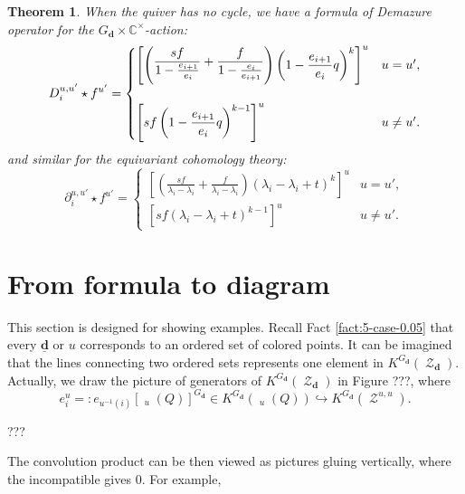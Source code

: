 \documentclass[reqno,11pt]{book}
\numberwithin{equation}{section}
\theoremstyle{plain}
\newtheorem{theorem}{Theorem}[section]
\theoremstyle{plain}
\numberwithin{equation}{section}
\theoremstyle{remark}
\DeclareMathOperator{\RRep}{\widetilde{\operatorname{Rep}}}
\DeclareMathOperator{\St}{\mathcal{Z}}
\newcommand{\dimvec}[1]{\mathbf{#1}}
\newcommand{\ftdimvec}[1]{\underline{\dimvec{#1}}}
\begin{document}
\begin{theorem}
When the quiver has no cycle, we have a formula of Demazure operator for the $G_{\dimvec{d}} \times \mathbb{C}^{\times}$-action:
\begin{equation*}\label{eq:Demazure_operator_C*action}
D_i^{u,u'} \star f^{u'}=\begin{cases}
\left[\left( \raisebox{1mm}{$\displaystyle\frac{sf}{ 1-\frac{e_{i+1}}{e_{i}}}     + \frac{f}{1-\frac{e_{i}}{e_{i+1}}}$}  \right)\left(\displaystyle 1-\frac{e_{i+1}}{e_{i}} q\right)^{k} \right]^{u} & u=u',\\[8mm]
\left[sf  \left(\displaystyle 1-\frac{e_{i+1}}{e_{i}} q\right)^{k-1} \right]^{u} & u \neq u'.
\end{cases}
\end{equation*}
and similar for the equivariant cohomology theory:
\begin{equation*}\label{eq:Demazure_operator_cth_C*action}
\partial_i^{u,u'} \star f^{u'}=\begin{cases}
\left[\left( \displaystyle\frac{sf}{ \lambda_{i}-\lambda_{i}}     + \frac{f}{\lambda_{i}-\lambda_{i} }  \right)\left(\lambda_{i}-\lambda_{i} +t \right)^{k} \right]^{u} & u=u',\\[8mm]
\left[sf  \left(\lambda_{i}-\lambda_{i} +t\right)^{k-1} \right]^{u} & u \neq u'.
\end{cases}
\end{equation*}
\end{theorem}
\section{From formula to diagram}\label{sec:diagram}
This section is designed for showing examples. Recall Fact \ref{fact:5-case-0.05} that every $\ftdimvec{d}$ or $u$ corresponds to an ordered set of colored points. It can be imagined that the lines connecting two ordered sets represents one element in $K^{G_{\dimvec{d}}}(\St_{\dimvec{d}})$. Actually, we draw the picture of generators of $K^{G_{\dimvec{d}}}(\St_{\dimvec{d}})$ in Figure ???, where
$$e_{i}^{u}=:e_{u^{-1}(i)} \left[ \RRep_{u}(Q) \right]^{G_{\dimvec{d}}} \in K^{G_{\dimvec{d}}} \left( \RRep_{u}(Q) \right) \hookrightarrow K^{G_{\dimvec{d}}} \left( \St^{u,u} \right).$$

???

The convolution product can be then viewed as pictures gluing vertically, where the incompatible gives $0$. For example,
\end{document}
